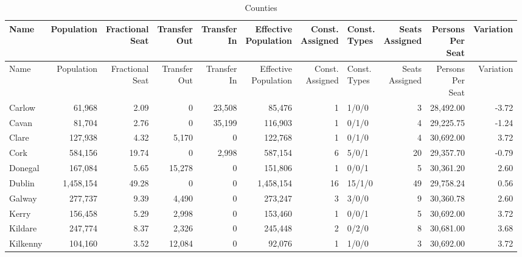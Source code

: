 \documentclass[a4paper]{article}
\begin{document}
\begin{longtable}{lrrrrrrlrrr}
\caption{Counties}
\\ \toprule
Name &Population &\shortstack{Fractional\\Seat} &\shortstack{Transfer\\Out} &\shortstack{Transfer\\In} &\shortstack{Effective\\Population} &\shortstack{Const.\\Assigned} &\shortstack{Const.\\Types} &\shortstack{Seats\\Assigned} &\shortstack{Persons\\Per\\Seat} &Variation \\ \midrule
\endfirsthead
\toprule
Name &Population &\shortstack{Fractional\\Seat} &\shortstack{Transfer\\Out} &\shortstack{Transfer\\In} &\shortstack{Effective\\Population} &\shortstack{Const.\\Assigned} &\shortstack{Const.\\Types} &\shortstack{Seats\\Assigned} &\shortstack{Persons\\Per\\Seat} &Variation \\ \midrule
\endhead
\bottomrule
\endfoot
Carlow&61,968& 2.09&0&23,508&85,476&1&1/0/0&3&28,492.00&-3.72\\ 
Cavan&81,704& 2.76&0&35,199&116,903&1&0/1/0&4&29,225.75&-1.24\\ 
Clare&127,938& 4.32&5,170&0&122,768&1&0/1/0&4&30,692.00& 3.72\\ 
Cork&584,156&19.74&0&2,998&587,154&6&5/0/1&20&29,357.70&-0.79\\ 
Donegal&167,084& 5.65&15,278&0&151,806&1&0/0/1&5&30,361.20& 2.60\\ 
Dublin&1,458,154&49.28&0&0&1,458,154&16&15/1/0&49&29,758.24& 0.56\\ 
Galway&277,737& 9.39&4,490&0&273,247&3&3/0/0&9&30,360.78& 2.60\\ 
Kerry&156,458& 5.29&2,998&0&153,460&1&0/0/1&5&30,692.00& 3.72\\ 
Kildare&247,774& 8.37&2,326&0&245,448&2&0/2/0&8&30,681.00& 3.68\\ 
Kilkenny&104,160& 3.52&12,084&0&92,076&1&1/0/0&3&30,692.00& 3.72\\ 

\end{longtable}
\end{document}
